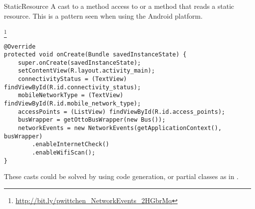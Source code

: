 \begin{pattern}{StaticResource}
%
%
A cast to a method access to  or a method that reads a static resource.
This is a pattern seen when using the Android platform. 

\instances{}

\footnote{\url{http://bit.ly/pwittchen_NetworkEvents_2HGbrMq}}

\begin{verbatim}
@Override
protected void onCreate(Bundle savedInstanceState) {
    super.onCreate(savedInstanceState);
    setContentView(R.layout.activity_main);
    connectivityStatus = (TextView) findViewById(R.id.connectivity_status);
    mobileNetworkType = (TextView) findViewById(R.id.mobile_network_type);
    accessPoints = (ListView) findViewById(R.id.access_points);
    busWrapper = getOttoBusWrapper(new Bus());
    networkEvents = new NetworkEvents(getApplicationContext(), busWrapper)
        .enableInternetCheck()
        .enableWifiScan();
}
\end{verbatim}

\detection{}

\discussion{}
%
%
These casts could be solved by using code generation,
or partial classes as in \csharp{}.

\end{pattern}